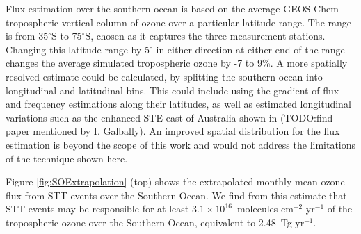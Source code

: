 \documentclass{article}
\begin{document}
  Flux estimation over the southern ocean is based on the average GEOS-Chem tropospheric vertical column of ozone over a particular latitude range.
  The range is from 35$^{\circ}$S to 75$^{\circ}$S, chosen as it captures the three measurement stations.
  Changing this latitude range by 5$^{\circ}$ in either direction at either end of the range changes the average simulated tropospheric ozone by -7 to 9\%.
  A more spatially resolved estimate could be calculated, by splitting the southern ocean into longitudinal and latitudinal bins.
  This could include using the gradient of flux and frequency estimations along their latitudes, as well as estimated longitudinal variations such as the enhanced STE east of Australia shown in (TODO:find paper mentioned by I. Galbally).
  An improved spatial distribution for the flux estimation is beyond the scope of this work and would not address the limitations of the technique shown here.
  
  Figure \ref{fig:SOExtrapolation} (top) shows the extrapolated monthly mean ozone flux from STT events over the Southern Ocean.
  We find from this estimate that STT events may be responsible for at least $3.1 \times10^{16}$~molecules cm$^{-2}$ yr$^{-1}$ of the tropospheric ozone over the Southern Ocean, equivalent to 2.48~Tg yr$^{-1}$.
    
\end{document}
